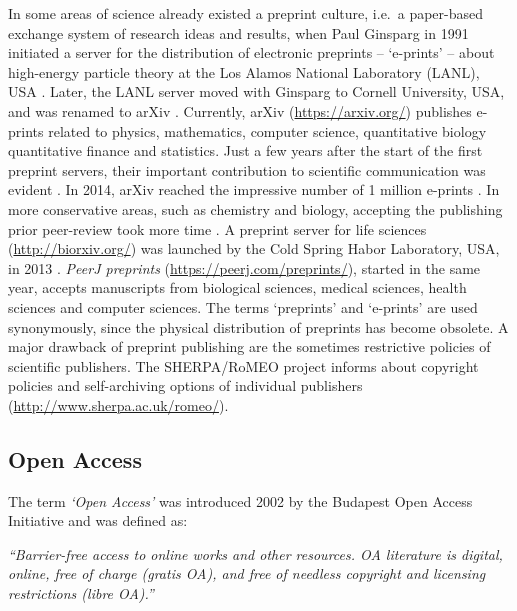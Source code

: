 \documentclass[10pt,fleqn]{wlpeerj}
\begin{document}
In
some
areas
of
science
already
existed
a
preprint
culture,
i.e.~a
paper-based
exchange
system
of
research
ideas
and
results,
when
Paul
Ginsparg
in
1991
initiated
a
server
for
the
distribution
of
electronic
preprints
--
`e-prints'
--
about
high-energy
particle
theory
at
the
Los
Alamos
National
Laboratory
(LANL),
USA
\citep{ginsparg_first_1994}.
Later,
the
LANL
server
moved
with
Ginsparg
to
Cornell
University,
USA,
and
was
renamed
to
arXiv
\citep{butler_alamos_2001}.
Currently,
arXiv
(\url{https://arxiv.org/})
publishes
e-prints
related
to
physics,
mathematics,
computer
science,
quantitative
biology
quantitative
finance
and
statistics.
Just
a few
years
after
the
start
of
the
first
preprint
servers,
their
important
contribution
to
scientific
communication
was
evident
\citep{ginsparg_first_1994, youngen_citation_1998, brown_e-volution_2001}.
In
2014,
arXiv
reached
the
impressive
number
of 1
million
e-prints
\citep{van_noorden_arxiv_2014}.
In
more
conservative
areas,
such
as
chemistry
and
biology,
accepting
the
publishing
prior
peer-review
took
more
time
\citep{brown_role_2003}.
A
preprint
server
for
life
sciences
(\url{http://biorxiv.org/})
was
launched
by
the
Cold
Spring
Habor
Laboratory,
USA,
in
2013
\citep{callaway_preprints_2013}.
\emph{PeerJ
preprints}
(\url{https://peerj.com/preprints/}),
started
in
the
same
year,
accepts
manuscripts
from
biological
sciences,
medical
sciences,
health
sciences
and
computer
sciences.
The
terms
`preprints'
and
`e-prints'
are
used
synonymously,
since
the
physical
distribution
of
preprints
has
become
obsolete.
A
major
drawback
of
preprint
publishing
are
the
sometimes
restrictive
policies
of
scientific
publishers.
The
SHERPA/RoMEO
project
informs
about
copyright
policies
and
self-archiving
options
of
individual
publishers
(\url{http://www.sherpa.ac.uk/romeo/}).

\subsection{Open
Access}\label{open-access}

The
term
\emph{`Open
Access'}
was
introduced
2002
by
the
Budapest
Open
Access
Initiative
and
was
defined
as:

\emph{``Barrier-free
access
to
online
works
and
other
resources.
OA
literature
is
digital,
online,
free
of
charge
(gratis
OA),
and
free
of
needless
copyright
and
licensing
restrictions
(libre
OA).''}
\citep{suber_open_2012}
\end{document}
